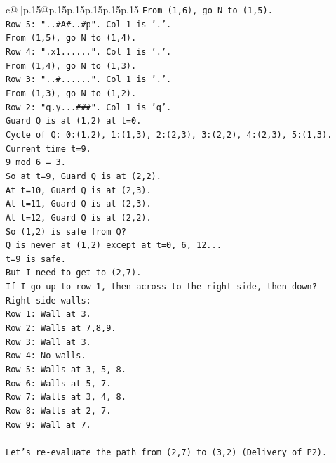 \documentclass{article}
\begin{document}
{\begin{supertabular}{c@{$\;$}|p{.15\linewidth}@{}p{.15\linewidth}p{.15\linewidth}p{.15\linewidth}p{.15\linewidth}p{.15\linewidth}}
{{{\texttt{From (1,6), go N to (1,5).} \\
\texttt{Row 5: "..\#A\#..\#p". Col 1 is '.'.} \\
\texttt{From (1,5), go N to (1,4).} \\
\texttt{Row 4: ".x1......". Col 1 is '.'.} \\
\texttt{From (1,4), go N to (1,3).} \\
\texttt{Row 3: "..\#......". Col 1 is '.'.} \\
\texttt{From (1,3), go N to (1,2).} \\
\texttt{Row 2: "q.y...\#\#\#". Col 1 is 'q'.} \\
\texttt{Guard Q is at (1,2) at t=0.} \\
\texttt{Cycle of Q: 0:(1,2), 1:(1,3), 2:(2,3), 3:(2,2), 4:(2,3), 5:(1,3).} \\
\texttt{Current time t=9.} \\
\texttt{9 mod 6 = 3.} \\
\texttt{So at t=9, Guard Q is at (2,2).} \\
\texttt{At t=10, Guard Q is at (2,3).} \\
\texttt{At t=11, Guard Q is at (2,3).} \\
\texttt{At t=12, Guard Q is at (2,2).} \\
\texttt{So (1,2) is safe from Q?} \\
\texttt{Q is never at (1,2) except at t=0, 6, 12...} \\
\texttt{t=9 is safe.} \\
\texttt{But I need to get to (2,7).} \\
\texttt{If I go up to row 1, then across to the right side, then down?} \\
\texttt{Right side walls:} \\
\texttt{Row 1: Wall at 3.} \\
\texttt{Row 2: Walls at 7,8,9.} \\
\texttt{Row 3: Wall at 3.} \\
\texttt{Row 4: No walls.} \\
\texttt{Row 5: Walls at 3, 5, 8.} \\
\texttt{Row 6: Walls at 5, 7.} \\
\texttt{Row 7: Walls at 3, 4, 8.} \\
\texttt{Row 8: Walls at 2, 7.} \\
\texttt{Row 9: Wall at 7.} \\
\\ 
\texttt{Let's re{-}evaluate the path from (2,7) to (3,2) (Delivery of P2).} \\
}}}
\end{supertabular}}
\end{document}
